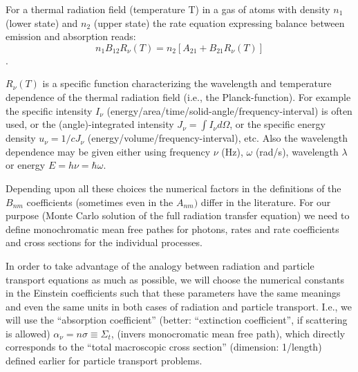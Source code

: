 For a thermal radiation field (temperature T) in a gas of atoms
with density $n_1$ (lower state) and $n_2$ (upper state) the rate
equation expressing balance between emission and absorption reads:
\[n_1 B_{12} R_\nu(T)= n_2[A_{21}+B_{21} R_\nu(T)]\].

$R_\nu(T)$ is a specific function characterizing the wavelength and
temperature dependence of the
thermal radiation field (i.e., the Planck-function). For example
the specific intensity $I_\nu$
(energy\-/area\-/time\-/solid-angle\-/frequency-interval) is often used, or the
(angle)-integrated intensity $J_\nu = \int I_\nu d\Omega$, or the
specific energy density $u_\nu = 1/c J_\nu$
(energy\-/volume\-/frequency-interval), etc. Also the wavelength
dependence may be given either using frequency $\nu$ (Hz), $\omega$
(rad/s), wavelength $\lambda$ or energy $E = h \nu=\hbar \omega$.

Depending upon all these choices the numerical factors in the
definitions of the $B_{nm}$ coefficients (sometimes even in the
$A_{nm})$ differ in the literature. For our purpose (Monte Carlo
solution of the full radiation transfer equation) we need to
define monochromatic mean free pathes for photons,
rates and rate coefficients
and cross sections for the individual processes.

In order to take advantage of the analogy between radiation and particle
transport equations as much as possible, we will choose the numerical constants
in the Einstein coefficients such that these
parameters have the same meanings and even the same units in both cases of
radiation and particle transport.
I.e., we will use the
``absorption coefficient'' (better: ``extinction coefficient'',
if scattering is allowed)
$\alpha_{\nu} = n \sigma \equiv \Sigma_t$,
(invers monocromatic mean free path), which directly corresponds to
the ``total macroscopic cross section'' (dimension: 1/length) defined earlier for
particle transport problems.




